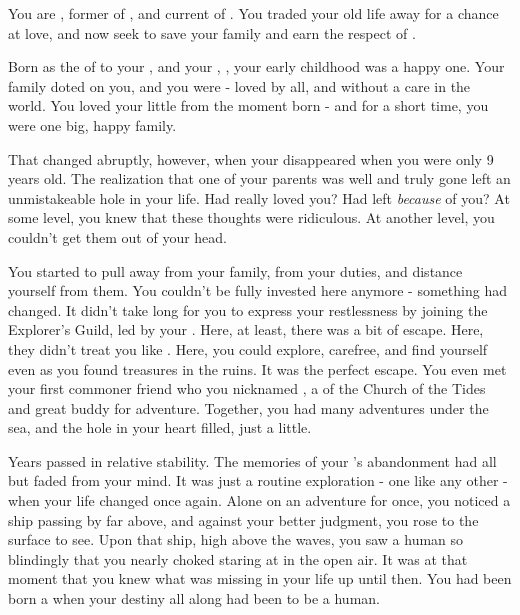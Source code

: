 \documentclass[char]{NeptuneBall}
\begin{document}
\name{\cAriel{}}





You are \cAriel{}, former \cAriel{\Prince} of \pAtlantis{}, and current \cAriel{\King} of \pAmerica{}. You traded your old life away for a chance at love, and now seek to save your family and earn the respect of \pAmerica{}.

Born as the \cAriel{\mer} \cAriel{\prince} of \pAtlantis{} to your \cKing{\parent}, \cKing{\King} \cKing{} and your \cQueen{\parent}, \cQueen{\King} \cQueen{}, your early childhood was a happy one. Your family doted on you, and you were \cAriel{\aprince} - loved by all, and without a care in the world. You loved your little \cPrincess{\sibling} \cPrincess{} from the moment \cPrincess{\they} \cPrincess{\were} born - and for a short time, you were one big, happy family.

That changed abruptly, however, when your \cQueen{\parent} disappeared when you were only 9 years old. The realization that one of your parents was well and truly gone left an unmistakeable hole in your life. Had \cQueen{\they} really loved you? Had \cQueen{\they} left \emph{because} of you? At some level, you knew that these thoughts were ridiculous. At another level, you couldn't get them out of your head.

You started to pull away from your family, from your duties, and distance yourself from them. You couldn't be fully invested here anymore - something had changed. It didn't take long for you to express your restlessness by joining the Explorer's Guild, led by your \cPlant{\Uncle} \cPlant{}. Here, at least, there was a bit of escape. Here, they didn't treat you like \cAriel{\aprince}. Here, you could explore, carefree, and find yourself even as you found treasures in the ruins. It was the perfect escape. You even met your first commoner friend who you nicknamed \cPriest{}, a \cPriest{\priest} of the Church of the Tides and great buddy for adventure. Together, you had many adventures under the sea, and the hole in your heart filled, just a little.

Years passed in relative stability. The memories of your \cQueen{\parent}'s abandonment had all but faded from your mind. It was just a routine exploration - one like any other - when your life changed once again. Alone on an adventure for once, you noticed a ship passing by far above, and against your better judgment, you rose to the surface to see. Upon that ship, high above the waves, you saw a human so blindingly \cEric{\hot} that you nearly choked staring at \cEric{\them} in the open air. It was at that moment that you knew what was missing in your life up until then. You had been born a \cAriel{\mer} when your destiny all along had been to be a human.
\end{document}
